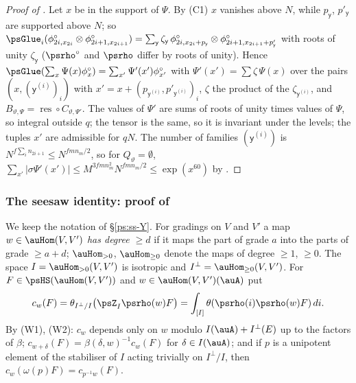 \documentclass[10pt]{amsart}
\theoremstyle{definition}
\theoremstyle{remark}
\begin{document}
\begin{proof}[Proof of {\cite[Proposition~14.25]{P46}}]
Let $x$ be in the support of $\Psi$. By (C1) $x$ vanishes above $N$, while $p_{\mathsf y}$,
$p'_{\mathsf y}$ are supported above $N$; so $\psGlue_i(\phi^\circ_{2i,x_{2i}}\otimes\phi^\circ_{2i+1,
x_{2i+1}})=\sum_{\mathsf y}\zeta_{\mathsf y}\,\phi^\circ_{2i,x_{2i}+p_{\mathsf y}}\otimes
\phi^\circ_{2i+1,x_{2i+1}+p'_{\mathsf y}}$ with roots of unity $\zeta_{\mathsf y}$ ($\psrho^\circ$
and $\psrho$ differ by roots of unity). Hence $\psGlue(\sum_x\Psi(x)\phi^\circ_x)=\sum_{x'}\Psi'(x')
\phi^\circ_{x'}$ with
$\Psi'(x')=\sum\zeta\,\Psi(x)$ over the pairs $(x,(\mathsf y^{(i)})_i)$ with $x'=x+(p_{\mathsf y^{(i)}},
p'_{\mathsf y^{(i)}})_i$, $\zeta$ the product of the $\zeta_{\mathsf y^{(i)}}$, and
$B_{\vartheta,\Psi}=\operatorname{res}\circ C_{\vartheta,\Psi'}$. The
values of $\Psi'$ are sums of roots of unity times values of $\Psi$, so integral outside $q$; the tensor is the same,
so it is invariant under the levels; the tuples $x'$ are admissible for $qN$. The number of
families $(\mathsf y^{(i)})$ is $N^{f\sum_in_{2i+1}}\le N^{fmn_m/2}$, so for $Q_\vartheta=\emptyset$,
$\sum_{x'}|\sigma\Psi'(x')|\le M^{3fmn_m^2}N^{fmn_m/2}\le\exp(x^{60})$ by {\cite[(38)]{P46}}.
\end{proof}

\subsubsection{The seesaw identity: proof of \texorpdfstring{{\cite[Proposition~14.19]{P46}}}{[Row D, Proposition~14.19]}}\label{ps:ss-seesaw}

We keep the notation of \S\ref{ps:ss-Y}. For gradings on $V$ and $V'$ a map $w\in\auHom(V,V')$
\emph{has degree $\ge d$} if it maps the part of grade $a$ into the parts of grade $\ge a+d$;
$\auHom_{>0}$, $\auHom_{\ge0}$ denote the maps of degree $\ge1$, $\ge0$. The space
$I=\auHom_{>0}(V,V')$ is isotropic and $I^\perp=\auHom_{\ge0}(V,V')$. For $F\in\psHS(\auHom(V,V'))$
and $w\in\auHom(V,V')(\auA)$ put
\[
c_w(F)=\theta_{I^\perp/I}\bigl(\psZ_I\psrho(w)F\bigr)=\int_{[I]}\theta(\psrho(i)\psrho(w)F)\,di .
\]
By (W1), (W2): $c_w$ depends only on $w$ modulo $I(\auA)+I^\perp(E)$ up to the factors of
$\beta$; $c_{w+\delta}(F)=\beta(\delta,w)^{-1}c_w(F)$ for $\delta\in I(\auA)$; and if $p$ is a
unipotent element of the stabiliser of $I$ acting trivially on $I^\perp/I$, then
$c_w(\omega(p)F)=c_{p^{-1}w}(F)$.
\end{document}
